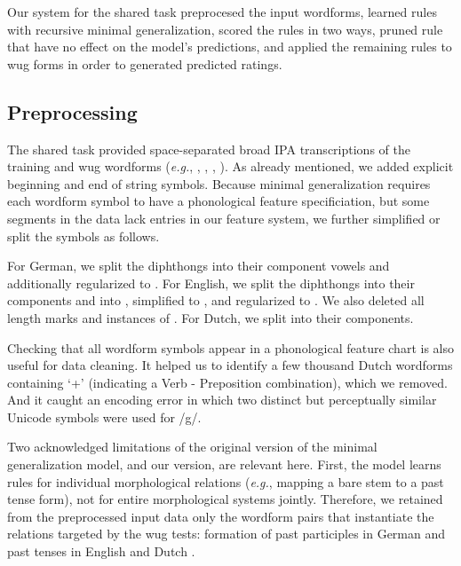 \documentclass[11pt]{article}
\begin{document}
Our system for the shared task preprocesed the input wordforms, learned rules with recursive minimal generalization, scored the rules in two ways, pruned rule that have no effect on the model's predictions, and  applied the remaining rules to wug forms in order to generated predicted ratings.

\subsection{Preprocessing}

The shared task provided space-separated broad IPA transcriptions of the training and wug wordforms (\emph{e.g.}, , , , ). As already mentioned, we added explicit beginning and end of string symbols. Because minimal generalization requires each wordform symbol to have a phonological feature specificiation, but some segments in the data lack entries in our feature system, we further simplified or split the symbols as follows.

For German, we split the diphthongs  into their component vowels and additionally regularized  to . For English, we split the diphthongs  into their components and \textipa{/3\textrhoticity/} into , simplified  to , and regularized  to . We also deleted all length marks \textipa{/:/} and instances of . For Dutch, we split  into their components.

Checking that all wordform symbols appear in a phonological feature chart is also useful for data cleaning. It helped us to identify a few thousand  Dutch wordforms containing `+' (indicating a Verb - Preposition combination), which we removed. And it caught an encoding error in which two distinct but perceptually similar Unicode symbols were used for /g/.

Two acknowledged limitations of the original version of the minimal generalization model, and our version, are relevant here. First, the model learns rules for individual morphological relations (\emph{e.g.}, mapping a bare stem to a past tense form), not for entire morphological systems jointly. Therefore, we retained from the preprocessed input data only the wordform pairs that instantiate the relations targeted by the wug tests: formation of past participles in German \citep{clahsen1999} and past tenses in English and Dutch \citep{booij2019}.
\end{document}
